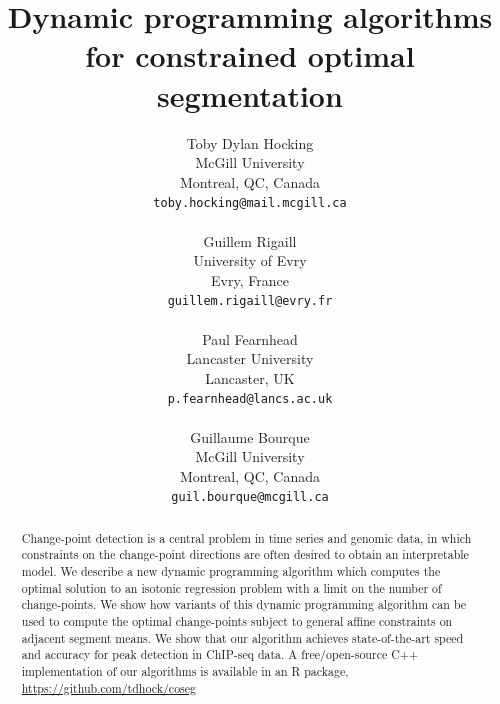 \documentclass{article}
\begin{document}
\title{Dynamic programming algorithms for
  constrained optimal segmentation}

\author{
  Toby Dylan Hocking\\
  McGill University\\
  Montreal, QC, Canada \\
  \texttt{toby.hocking@mail.mcgill.ca} \\
   \\
  Guillem Rigaill \\
  University of Evry \\
  Evry, France \\
  \texttt{guillem.rigaill@evry.fr} \\
  \\
  Paul Fearnhead \\
  Lancaster University \\
  Lancaster, UK \\
  \texttt{p.fearnhead@lancs.ac.uk} \\
  \\
  Guillaume Bourque \\
  McGill University \\
  Montreal, QC, Canada \\
  \texttt{guil.bourque@mcgill.ca} \\
}

\maketitle

\begin{abstract}
  Change-point detection is a central problem in time series and
  genomic data, in which constraints on the change-point directions
  are often desired to obtain an interpretable model. We describe a
  new dynamic programming algorithm which computes the optimal
  solution to an isotonic regression problem with a limit on the
  number of change-points. We show how variants of this dynamic
  programming algorithm can be used to compute the optimal
  change-points subject to general affine constraints on adjacent
  segment means. We show that our algorithm achieves state-of-the-art
  speed and accuracy for peak detection in ChIP-seq data. A
  free/open-source C++ implementation of our algorithms is available in
  an R package, \url{https://github.com/tdhock/coseg}
\end{abstract}
\end{document}
